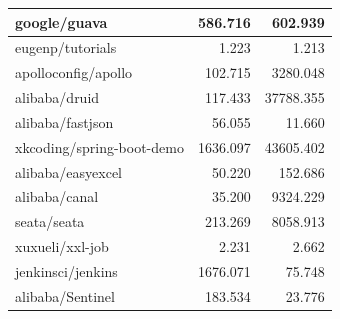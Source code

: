 \begin{table}
\begin{tabular}{|l|rr|}
		google/guava                                                                                 & \multicolumn{1}{r|}{586.716}               & 602.939                            \\ \hline
		eugenp/tutorials                                                                             & \multicolumn{1}{r|}{1.223}                 & 1.213                              \\ \hline
		apolloconfig/apollo                                                                          & \multicolumn{1}{r|}{102.715}               & 3280.048                           \\ \hline
		alibaba/druid                                                                                & \multicolumn{1}{r|}{117.433}               & 37788.355                          \\ \hline
		alibaba/fastjson                                                                             & \multicolumn{1}{r|}{56.055}                & 11.660                             \\ \hline
		xkcoding/spring-boot-demo                                                                    & \multicolumn{1}{r|}{1636.097}              & 43605.402                          \\ \hline
		alibaba/easyexcel                                                                            & \multicolumn{1}{r|}{50.220}                & 152.686                            \\ \hline
		alibaba/canal                                                                                & \multicolumn{1}{r|}{35.200}                & 9324.229                           \\ \hline
		seata/seata                                                                                  & \multicolumn{1}{r|}{213.269}               & 8058.913                           \\ \hline
		xuxueli/xxl-job                                                                              & \multicolumn{1}{r|}{2.231}                 & 2.662                              \\ \hline
		jenkinsci/jenkins                                                                            & \multicolumn{1}{r|}{1676.071}              & 75.748                             \\ \hline
		alibaba/Sentinel                                                                             & \multicolumn{1}{r|}{183.534}               & 23.776                             \\ \hline

\end{tabular}
\end{table}
